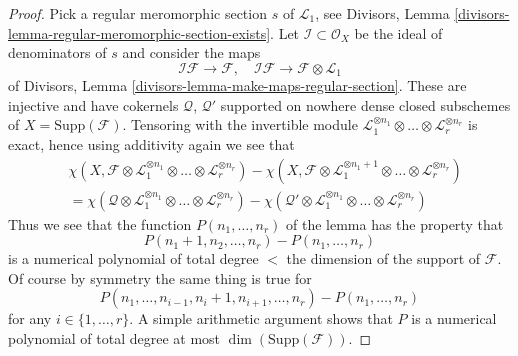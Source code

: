 \begin{proof}
\medskip\noindent
Pick a regular meromorphic section $s$ of $\mathcal{L}_1$, see
Divisors, Lemma \ref{divisors-lemma-regular-meromorphic-section-exists}.
Let $\mathcal{I} \subset \mathcal{O}_X$ be the ideal of
denominators of $s$ and consider the maps
$$
\mathcal{I}\mathcal{F} \to \mathcal{F},\quad
\mathcal{I}\mathcal{F} \to \mathcal{F} \otimes \mathcal{L}_1
$$
of Divisors, Lemma \ref{divisors-lemma-make-maps-regular-section}.
These are injective and have cokernels $\mathcal{Q}$, $\mathcal{Q}'$
supported on nowhere dense closed subschemes of $X = \text{Supp}(\mathcal{F})$.
Tensoring with the invertible module
$\mathcal{L}_1^{\otimes n_1} \otimes \ldots \otimes \mathcal{L}_r^{\otimes n_r}$
is exact, hence using additivity again
we see that
\begin{align*}
&\chi(X, \mathcal{F} \otimes \mathcal{L}_1^{\otimes n_1} \otimes \ldots \otimes
\mathcal{L}_r^{\otimes n_r}) -
\chi(X, \mathcal{F} \otimes \mathcal{L}_1^{\otimes n_1 + 1}
\otimes \ldots \otimes \mathcal{L}_r^{\otimes n_r}) \\
& =
\chi(\mathcal{Q} \otimes \mathcal{L}_1^{\otimes n_1} \otimes \ldots \otimes
\mathcal{L}_r^{\otimes n_r}) -
\chi(\mathcal{Q}' \otimes \mathcal{L}_1^{\otimes n_1} \otimes \ldots \otimes
\mathcal{L}_r^{\otimes n_r})
\end{align*}
Thus we see that the function $P(n_1, \ldots, n_r)$ of the lemma has
the property that
$$
P(n_1 + 1, n_2, \ldots, n_r) - P(n_1, \ldots, n_r)
$$
is a numerical polynomial of total degree $<$ the dimension
of the support of $\mathcal{F}$. Of course by symmetry the same
thing is true for
$$
P(n_1, \ldots, n_{i - 1}, n_i + 1, n_{i + 1}, \ldots, n_r)
- P(n_1, \ldots, n_r)
$$
for any $i \in \{1, \ldots, r\}$. A simple arithmetic argument shows
that $P$ is a numerical polynomial of total degree at most
$\dim(\text{Supp}(\mathcal{F}))$.
\end{proof}